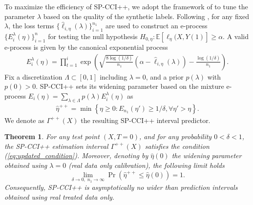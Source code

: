 \documentclass{article}
\theoremstyle{plain}
\newtheorem{theorem}{Theorem}[section]
\theoremstyle{definition}
\theoremstyle{remark}
\begin{document}
To maximize the efficiency of SP-CCI++, we adopt the framework of \citealt{park2025adaptive} to tune the parameter $\lambda$ based on the quality of the synthetic labels. Following \citealt{park2025adaptive}, for any fixed $\lambda$, the loss terms $\{\hat{\ell}_{i,\eta}(\lambda)\}^{n_1}_{i=1}$ are used to construct an e-process $\{E^\lambda_i(\eta)\}^n_{i=1}$ for testing the null hypothesis $H_{0,\eta}:\mathbb{E}[\ell_{\eta}(X,Y(1)]\geq\alpha$. A valid e-process is given by the canonical exponential process \citep{waudby2024estimating}
\begin{align}
    \label{eq:e-process_exp}
    E^\lambda_i(\eta)=\prod^i_{t=1}\exp\left(\sqrt{\frac{8\log(1/\delta)}{n_1}}(\alpha-\hat{\ell}_{i,\eta}(\lambda))-\frac{\log(1/\delta)}{n_1}\right).
\end{align}
Fix a discretization $\Lambda\subset[0,1]$ including $\lambda=0$, and a prior $p(\lambda)$ with $p(0)>0$. SP-CCI++ sets its widening parameter based on the mixture e-process
$E_i(\eta)=\sum_{\lambda\in\Lambda}p(\lambda)E^\lambda_i(\eta)$ as
\begin{align}
    \label{eq:scpi++}
    \hat{\eta}^{++}=\min\left\{\eta\geq0: E_{n_1}(\eta')\geq 1/\delta, \forall \eta'>\eta\right\}.
\end{align}
We denote as $\Gamma^{++}(X)$ the resulting SP-CCI++ interval predictor.

\begin{theorem}
\label{thm:appendix_no_underperform}
 For any test point $(X,T = 0)$, and for any probability $0<\delta<1$, the SP-CCI++ estimation interval  $\Gamma^{++}(X)$  satisfies the condition (\ref{eq:updated_condition}).
Moreover, denoting by $\hat{\eta}(0)$ the widening parameter obtained using $\lambda = 0$ (real data only calibration), the following limit holds
\begin{equation}
\label{eq:no_underperform_limit}
\lim_{\delta \to 0,\; n_1 \to \infty}
\Pr\!\left(
\hat{\eta}^{++} \le \hat{\eta}(0)
\right)
=
1.
\end{equation}
Consequently, SP-CCI++ is asymptotically no wider than prediction intervals obtained using real treated data only.
\end{theorem}
\end{document}
